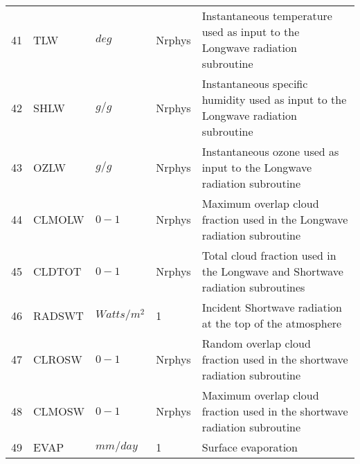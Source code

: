 \begin{tabular}{lllll}
41 & TLW      &    $deg$   &  Nrphys 
         &\begin{minipage}[t]{3in}
          {Instantaneous temperature used as input to the Longwave radiation
          subroutine} 
         \end{minipage}\\
42 & SHLW     &    $g/g$   &  Nrphys 
         &\begin{minipage}[t]{3in}
          {Instantaneous specific humidity used as input to the Longwave radiation
          subroutine} 
         \end{minipage}\\
43 & OZLW     &    $g/g$   &  Nrphys 
         &\begin{minipage}[t]{3in}
          {Instantaneous ozone used as input to the Longwave radiation
          subroutine} 
         \end{minipage}\\
44 & CLMOLW   &    $0-1$   &  Nrphys 
         &\begin{minipage}[t]{3in}
          {Maximum overlap cloud fraction used in the Longwave radiation
          subroutine} 
         \end{minipage}\\
45 & CLDTOT   &    $0-1$   &  Nrphys 
         &\begin{minipage}[t]{3in}
          {Total cloud fraction used in the Longwave and Shortwave radiation
          subroutines} 
         \end{minipage}\\
46 & RADSWT   &    $Watts/m^2$   &  1 
         &\begin{minipage}[t]{3in}
          {Incident Shortwave radiation at the top of the atmosphere}
         \end{minipage}\\
47 & CLROSW   &    $0-1$   &  Nrphys 
         &\begin{minipage}[t]{3in}
          {Random overlap cloud fraction used in the shortwave radiation
          subroutine} 
         \end{minipage}\\
48 & CLMOSW   &    $0-1$   &  Nrphys 
         &\begin{minipage}[t]{3in}
          {Maximum overlap cloud fraction used in the shortwave radiation
          subroutine} 
         \end{minipage}\\
49 & EVAP     &    $mm/day$   &  1 
         &\begin{minipage}[t]{3in}
          {Surface evaporation}
         \end{minipage}\\
\end{tabular}
\vfill

